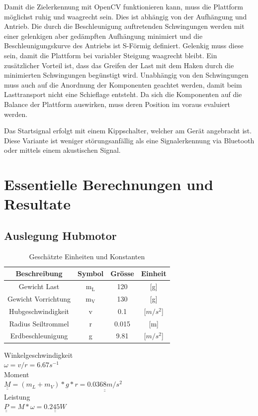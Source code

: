 \documentclass[a4paper]{report}
\begin{document}
Damit die Zielerkennung mit OpenCV funktionieren kann, muss die Plattform möglichst ruhig und waagrecht sein. Dies ist abhängig von der Aufhängung und Antrieb. Die durch die Beschleunigung auftretenden Schwingungen werden mit einer gelenkigen aber gedämpften Aufhängung minimiert und die Beschleunigungskurve des Antriebs ist S-Förmig definiert. Gelenkig muss diese sein, damit die Plattform bei variabler Steigung waagrecht bleibt. Ein zusätzlicher Vorteil ist, dass das Greifen der Last mit dem Haken durch die minimierten Schwingungen begünstigt wird. Unabhängig von den Schwingungen muss auch auf die Anordnung der Komponenten geachtet werden, damit beim Lasttransport nicht eine Schieflage entsteht. Da sich die Komponenten auf die Balance der Plattform auswirken, muss deren Position im voraus evaluiert werden.

Das Startsignal erfolgt mit einem Kippschalter, welcher am Gerät angebracht ist. Diese Variante ist weniger störungsanfällig als eine Signalerkennung via Bluetooth oder mittels einem akustischen Signal.


\section{Essentielle Berechnungen und Resultate}
\label{sec:EssBerechnung}
\subsection{Auslegung Hubmotor}
\begin{table}[h!]
	\centering
	\begin{tabular}{|c|c|c|c|}
		\hline
		\textbf{Beschreibung}& \textbf{Symbol} & \textbf{Grösse} & \textbf{Einheit} \\
		\hline
		Gewicht Last& m$_{\text{L}}$ & 120 & [g] \\
		\hline
		Gewicht Vorrichtung& m$_{\text{V}}$ & 130 & [g] \\
		\hline
		Hubgeschwindigkeit& v & 0.1 & [$m/s^2$] \\
		\hline
		Radius Seiltrommel & r & 0.015 & [m]\\
		\hline
		Erdbeschleunigung & g & 9.81 & [$m/s^2$]\\
		\hline
	\end{tabular}
	\caption{Geschätzte Einheiten und Konstanten}
\end{table}
\noindent
Winkelgeschwindigkeit\\
$\omega=v/r=6.67s^{-1}$	\\
Moment\\
$\underline{\underline{M}}=(m_L+m_V)*g*r=\underline{\underline{0.0368m/s^2}}$\\
Leistung	\\
$\underline{\underline{P}}=M*\omega=\underline{\underline{0.245W}}$
\end{document}
